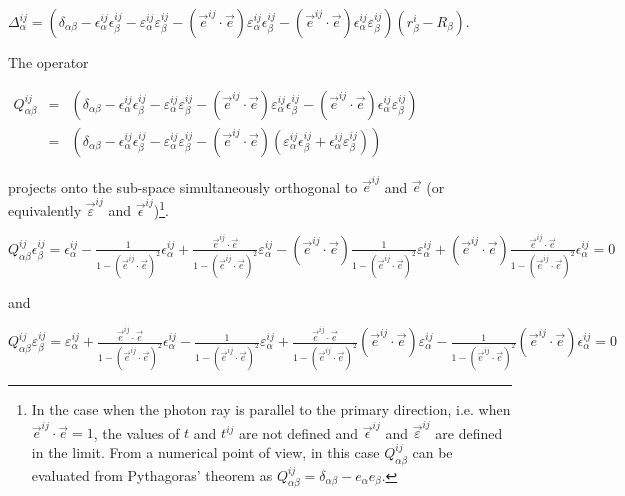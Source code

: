 \documentclass[letterpaper]{article}
\begin{document}
$\displaystyle \Delta_{\alpha}^{ij}=\left(\delta_{\alpha\beta}
-\epsilon_{\alpha}^{ij}\epsilon_{\beta}^{ij}
-\varepsilon_{\alpha}^{ij}\varepsilon_{\beta}^{ij}
-(\vec{e}^{ij}\cdot\vec{e})\varepsilon_{\alpha}^{ij}\epsilon_{\beta}^{ij}
-(\vec{e}^{ij}\cdot\vec{e})
\epsilon_{\alpha}^{ij}\varepsilon_{\beta}^{ij}\right)
\left(r_{\beta}^{i}-R_{\beta}\right)$.

The operator 

$\displaystyle \begin{array}{lll}
Q_{\alpha\beta}^{ij}
& = &\left(\delta_{\alpha\beta}-\epsilon_{\alpha}^{ij}\epsilon_{\beta}^{ij}
-\varepsilon_{\alpha}^{ij}\varepsilon_{\beta}^{ij}
-(\vec{e}^{ij}\cdot\vec{e})
\varepsilon_{\alpha}^{ij}\epsilon_{\beta}^{ij}
-(\vec{e}^{ij}\cdot\vec{e})
\epsilon_{\alpha}^{ij}\varepsilon_{\beta}^{ij}\right) \\
& = & \left(\delta_{\alpha\beta}-\epsilon_{\alpha}^{ij}\epsilon_{\beta}^{ij}
-\varepsilon_{\alpha}^{ij}\varepsilon_{\beta}^{ij}
-(\vec{e}^{ij}\cdot\vec{e})
(\varepsilon_{\alpha}^{ij}\epsilon_{\beta}^{ij}
+\epsilon_{\alpha}^{ij}\varepsilon_{\beta}^{ij})\right)
\end{array}$

projects onto the sub-space simultaneously orthogonal to
$\vec{e}^{ij}$ and $\vec{e}$ (or equivalently $\vec{\varepsilon}^{ij}$
and $\vec{\epsilon}^{ij}$)\footnote{In the case when the photon ray is
parallel to the primary direction, i.e. when
$\vec{e}^{ij}\cdot\vec{e}=1$, the values of $t$ and $t^{ij}$ are not
defined and $\vec{\epsilon}^{ij}$ and $\vec{\varepsilon}^{ij}$ are
defined in the limit. From a numerical point of view, in this case
$Q_{\alpha\beta}^{ij}$ can be evaluated from Pythagoras' theorem as
$Q_{\alpha\beta}^{ij}=\delta_{\alpha\beta}-e_\alpha e_\beta$.}.

$\displaystyle Q_{\alpha\beta}^{ij}\epsilon_{\beta }^{ij}=
\epsilon_{\alpha}^{ij}-\frac{1}{1-(\vec{e}^{ij}\cdot\vec{e})^{2}}
\epsilon_{\alpha}^{ij}+\frac{\vec{e}^{ij}\cdot\vec{e}}
{1-(\vec{e}^{ij}\cdot\vec{e})^{2}}\varepsilon_{\alpha}^{ij}
-(\vec{e}^{ij}\cdot\vec{e})\frac{1}{1-(\vec{e}^{ij}\cdot\vec{e})^{2}}
\varepsilon_{\alpha}^{ij}
+(\vec{e}^{ij}\cdot\vec{e})\frac{\vec{e}^{ij}\cdot\vec{e}}
{1-(\vec{e}^{ij}\cdot\vec{e})^{2}}\epsilon_{\alpha}^{ij}=0$

and

$\displaystyle Q_{\alpha\beta}^{ij}\varepsilon_{\beta }^{ij}=
\varepsilon_{\alpha}^{ij}
+\frac{\vec{e}^{ij}\cdot\vec{e}}{1-(\vec{e}^{ij}\cdot\vec{e})^{2}}
\epsilon_{\alpha}^{ij}
-\frac{1}{1-(\vec{e}^{ij}\cdot\vec{e})^{2}}\varepsilon_{\alpha}^{ij}
+\frac{\vec{e}^{ij}\cdot\vec{e}}{1-(\vec{e}^{ij}\cdot\vec{e})^{2}}
(\vec{e}^{ij}\cdot\vec{e})\varepsilon_{\alpha}^{ij}
-\frac{1}{1-(\vec{e}^{ij}\cdot\vec{e})^{2}}
(\vec{e}^{ij}\cdot\vec{e})\epsilon_{\alpha}^{ij}=0$
\end{document}
